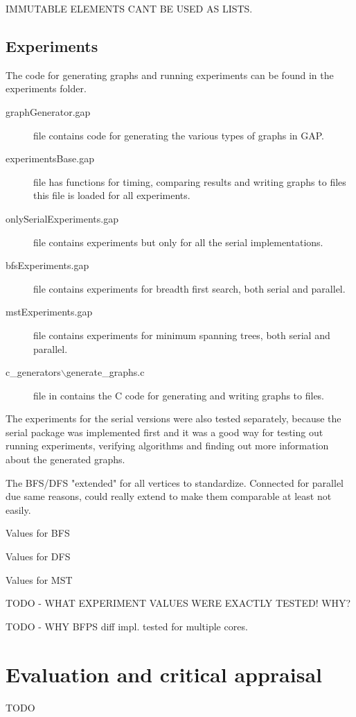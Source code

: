 \documentclass{report}
\theoremstyle{plain}
\theoremstyle{definition}
\theoremstyle{remark}
\begin{document}
IMMUTABLE ELEMENTS CANT BE USED AS LISTS.

\section{Experiments}

The code for generating graphs and running experiments can be found in the experiments folder.
\begin{description}
\item[graphGenerator.gap] file contains code for generating the various types of graphs in GAP.
\item[experimentsBase.gap] file has functions for timing, comparing results and writing graphs to files this file is loaded for all experiments.
\item[onlySerialExperiments.gap] file contains experiments but only for all the serial implementations.
\item[bfsExperiments.gap] file contains experiments for breadth first search, both serial and parallel.
\item[mstExperiments.gap] file contains experiments for minimum spanning trees, both serial and parallel.
\item[c\_generators$\backslash$generate\_graphs.c] file in contains the C code for generating and writing graphs to files.
\end{description}

The experiments for the serial versions were also tested separately, because the serial package was implemented first and it was a good way for testing out running experiments, verifying algorithms and finding out more information about the generated graphs.

The BFS/DFS "extended" for all vertices to standardize. Connected for parallel due same reasons, could really extend to make them comparable at least not easily.

Values for BFS

Values for DFS

Values for MST

TODO - WHAT EXPERIMENT VALUES WERE EXACTLY TESTED! WHY?

TODO - WHY BFPS diff impl. tested for multiple cores.

\chapter{Evaluation and critical appraisal}

TODO
\end{document}
